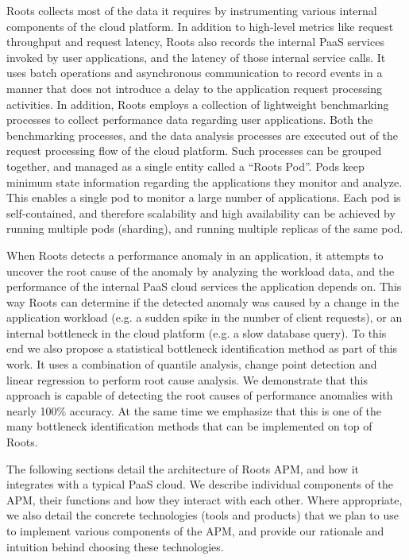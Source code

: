 Roots collects most of the data it requires by instrumenting various internal components 
of the cloud platform. In addition to high-level metrics like request throughput
and request latency, Roots also records the internal PaaS services invoked by user applications,
and the latency of those internal service calls. It uses batch operations and asynchronous 
communication to record events in a manner that does not introduce a
delay to the application request processing activities. 
In addition, Roots employs a collection of lightweight  benchmarking
processes to collect performance data regarding user applications. Both
the benchmarking processes, and the data analysis processes are executed 
out of the request processing flow of the cloud platform. Such processes can be
grouped together, and managed as a single entity called a
``Roots Pod''. Pods keep minimum state
information regarding the applications they monitor and analyze. This enables
a single pod to monitor a large number of applications. Each pod is self-contained,
and therefore scalability and high availability can be achieved by running multiple pods (sharding),
and running multiple replicas of the same pod.

When Roots detects a performance anomaly in an application, it attempts to uncover the
root cause of the anomaly by analyzing the workload data,
and the performance of the internal PaaS cloud services the application depends on. 
This way Roots can determine if the detected anomaly was caused by a change in the
application workload (e.g. a sudden spike in the number of client requests), or an internal
bottleneck in the cloud platform (e.g. a slow database query). To this end we also propose
a statistical bottleneck identification method as part of this work. 
It uses a combination of quantile analysis, change point detection
and linear regression to perform root cause analysis. We demonstrate that this approach is
capable of detecting the root causes of performance anomalies with nearly 100\% accuracy. 
At the same time we emphasize that this is one of the many bottleneck identification methods
that can be implemented on top of Roots.

The following sections detail the architecture of Roots APM, and how it integrates with a typical PaaS
cloud. We describe individual components of the APM, their functions and how they interact with each
other. Where appropriate, we also detail the concrete technologies (tools and products) that we plan to use to implement
various components of the APM, and provide our rationale and intuition behind choosing these technologies.
